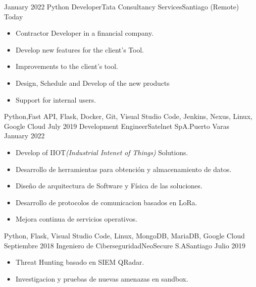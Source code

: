 %
%
%

\begin{experiences}
  \experience
    {January 2022}   {Python Developer}{Tata Consultancy Services}{Santiago (Remote)}
    {Today} 
    {
      \begin{itemize}
        \item Contractor Developer in a financial company.
        \item Develop new features for the client's Tool.
        \item Improvements to the client's tool.
        \item Design, Schedule and Develop of the new products
        \item Support for internal users.
      \end{itemize}
    }{Python,Fast API, Flask, Docker, Git, Visual Studio Code, Jenkins, Nexus, Linux, Google Cloud}
  \emptySeparator
  \experience
    {July 2019} {Development Engineer}{Satelnet SpA.}{Puerto Varas}
    {January 2022}    
    {
      \begin{itemize}
        \item Develop of IIOT{\it (Industrial Intenet of Things)} Solutions.
        \item Desarrollo de herramientas para obtención y almacenamiento de datos.
        \item Diseño de arquitectura de Software y Física de las soluciones.
        \item Desarrollo de protocolos de comunicacion basados en LoRa.
        \item Mejora continua de servicios operativos.                            
      \end{itemize}
    }{Python, Flask, Visual Studio Code, Linux, MongoDB, MariaDB, Google Cloud}
  \emptySeparator
  \experience
    {Septiembre 2018}     {Ingeniero de Ciberseguridad}{NeoSecure S.A}{Santiago}
    {Julio 2019}    
    {
      \begin{itemize}
        \item Threat Hunting basado en SIEM QRadar.
        \item Investigacion y pruebas de nuevas amenazas en sandbox.              

\end{itemize}}
\end{experiences}
